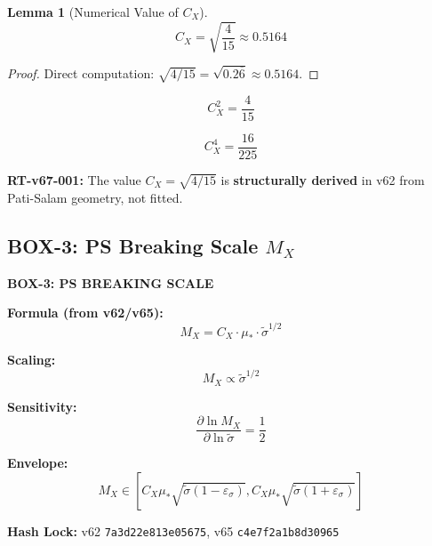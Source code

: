 \documentclass[11pt,letterpaper]{article}
\newtheorem{lemma}[theorem]{Lemma}
\newcommand{\st}{\tilde{\sigma}}
\newcommand{\eps}{\varepsilon}
\begin{document}
\begin{lemma}[Numerical Value of $C_X$]
\label{lem:cx-numerical}
\begin{equation}
C_X = \sqrt{\frac{4}{15}} \approx 0.5164
\label{eq:cx-numerical}
\end{equation}
\end{lemma}

\begin{proof}
Direct computation: $\sqrt{4/15} = \sqrt{0.2\overline{6}} \approx 0.5164$.
\end{proof}

\begin{equation}
C_X^2 = \frac{4}{15}
\label{eq:cx-squared}
\end{equation}

\begin{equation}
C_X^4 = \frac{16}{225}
\label{eq:cx-fourth}
\end{equation}

\begin{reviewertrap}
\textbf{RT-v67-001:} The value $C_X = \sqrt{4/15}$ is \textbf{structurally derived} in v62 from Pati-Salam geometry, not fitted.
\end{reviewertrap}

\subsection{BOX-3: PS Breaking Scale $M_X$}
\label{subsec:box3}

\begin{closurebox}
\textbf{BOX-3: PS BREAKING SCALE}

\textbf{Formula (from v62/v65):}
\begin{equation}
\boxed{
M_X = C_X \cdot \mu_* \cdot \st^{1/2}
}
\label{eq:box3-mx}
\end{equation}

\textbf{Scaling:}
\begin{equation}
M_X \propto \st^{1/2}
\label{eq:mx-scaling}
\end{equation}

\textbf{Sensitivity:}
\begin{equation}
\frac{\partial \ln M_X}{\partial \ln \st} = \frac{1}{2}
\label{eq:mx-sensitivity}
\end{equation}

\textbf{Envelope:}
\begin{equation}
M_X \in \left[ C_X \mu_* \sqrt{\st(1-\eps_\sigma)}, C_X \mu_* \sqrt{\st(1+\eps_\sigma)} \right]
\label{eq:mx-envelope}
\end{equation}

\textbf{Hash Lock:} v62 \texttt{7a3d22e813e05675}, v65 \texttt{c4e7f2a1b8d30965}
\end{closurebox}
\end{document}

